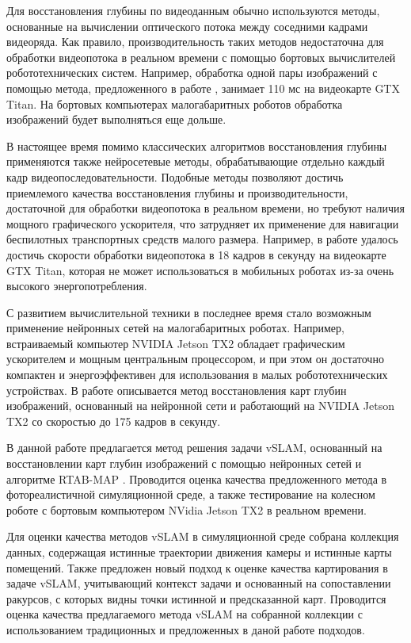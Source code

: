 \documentclass{mipt-thesis-ms}
\begin{document}
	Для восстановления глубины по видеоданным обычно используются методы, основанные на вычислении оптического потока между соседними кадрами видеоряда. Как правило, производительность таких методов недостаточна для обработки видеопотока в реальном времени с помощью бортовых вычислителей робототехнических систем. Например, обработка одной пары изображений с помощью метода, предложенного в работе \cite{ummenhofer2017demon}, занимает 110 мс на видеокарте GTX Titan. На бортовых компьютерах малогабаритных роботов обработка изображений будет выполняться еще дольше.
	
	В настоящее время помимо классических алгоритмов восстановления глубины применяются также нейросетевые методы, обрабатывающие отдельно каждый кадр видеопоследовательности. Подобные методы позволяют достичь приемлемого качества восстановления глубины  и производительности, достаточной для обработки видеопотока в реальном времени, но требуют наличия мощного графического ускорителя, что затрудняет их применение для навигации беспилотных транспортных средств малого размера. Например, в работе \cite{laina2016deeper} удалось достичь скорости обработки видеопотока в 18 кадров в секунду на видеокарте GTX Titan, которая не может использоваться в мобильных роботах из-за очень высокого энергопотребления.
	
	С развитием вычислительной техники в последнее время стало возможным применение нейронных сетей на малогабаритных роботах. Например, встраиваемый компьютер NVIDIA Jetson TX2 \cite{franklin2017nvidia} обладает графическим ускорителем и мощным центральным процессором, и при этом он достаточно компактен и энергоэффективен для использования в малых робототехнических устройствах. В работе \cite{wofk2019fastdepth} описывается метод восстановления карт глубин изображений, основанный на нейронной сети и работающий на NVIDIA Jetson TX2 со скоростью до 175 кадров в секунду.
	
	В данной работе предлагается метод решения задачи vSLAM, основанный на восстановлении карт глубин изображений с помощью нейронных сетей и алгоритме RTAB-MAP \cite{labbe2011memory}. Проводится оценка качества предложенного метода в фотореалистичной симуляционной среде, а также тестирование на колесном роботе с бортовым компьютером NVidia Jetson TX2 в реальном времени.
	
	Для оценки качества методов vSLAM в симуляционной среде собрана коллекция данных, содержащая истинные траектории движения камеры и истинные карты помещений. Также предложен новый подход к оценке качества картирования в задаче vSLAM, учитывающий контекст задачи и основанный на сопоставлении ракурсов, с которых видны точки истинной и предсказанной карт. Проводится оценка качества предлагаемого метода vSLAM на собранной коллекции с использованием традиционных и предложенных в даной работе подходов.
	
\end{document}
